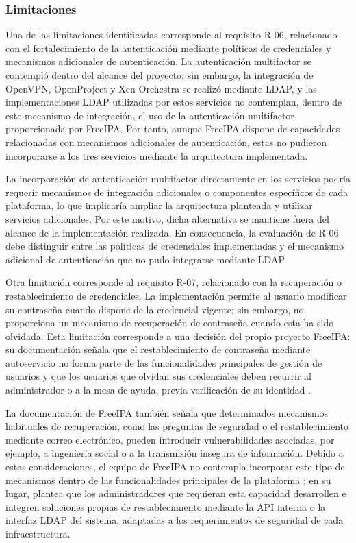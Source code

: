 \subsubsection{Limitaciones}
Una de las limitaciones identificadas corresponde al requisito R-06, relacionado con el fortalecimiento de la autenticación mediante políticas de credenciales y mecanismos adicionales de autenticación. La autenticación multifactor se contempló dentro del alcance del proyecto; sin embargo, la integración de OpenVPN, OpenProject y Xen Orchestra se realizó mediante \ac{LDAP}, y las implementaciones \ac{LDAP} utilizadas por estos servicios no contemplan, dentro de este mecanismo de integración, el uso de la autenticación multifactor proporcionada por FreeIPA. Por tanto, aunque FreeIPA dispone de capacidades relacionadas con mecanismos adicionales de autenticación, estas no pudieron incorporarse a los tres servicios mediante la arquitectura implementada.

La incorporación de autenticación multifactor directamente en los servicios podría requerir mecanismos de integración adicionales o componentes específicos de cada plataforma, lo que implicaría ampliar la arquitectura planteada y utilizar servicios adicionales. Por este motivo, dicha alternativa se mantiene fuera del alcance de la implementación realizada. En consecuencia, la evaluación de R-06 debe distinguir entre las políticas de credenciales implementadas y el mecanismo adicional de autenticación que no pudo integrarse mediante \ac{LDAP}.

Otra limitación corresponde al requisito R-07, relacionado con la recuperación o restablecimiento de credenciales. La implementación permite al usuario modificar su contraseña cuando dispone de la credencial vigente; sin embargo, no proporciona un mecanismo de recuperación de contraseña cuando esta ha sido olvidada. Esta limitación corresponde a una decisión del propio proyecto FreeIPA: su documentación señala que el restablecimiento de contraseña mediante autoservicio no forma parte de las funcionalidades principales de gestión de usuarios y que los usuarios que olvidan sus credenciales deben recurrir al administrador o a la mesa de ayuda, previa verificación de su identidad \citep{FreeIPAReset2026}.

La documentación de FreeIPA también señala que determinados mecanismos habituales de recuperación, como las preguntas de seguridad o el restablecimiento mediante correo electrónico, pueden introducir vulnerabilidades asociadas, por ejemplo, a ingeniería social o a la transmisión insegura de información. Debido a estas consideraciones, el equipo de FreeIPA no contempla incorporar este tipo de mecanismos dentro de las funcionalidades principales de la plataforma \citep{FreeIPAReset2026}; en su lugar, plantea que los administradores que requieran esta capacidad desarrollen e integren soluciones propias de restablecimiento mediante la \ac{API} interna o la interfaz \ac{LDAP} del sistema, adaptadas a los requerimientos de seguridad de cada infraestructura.
